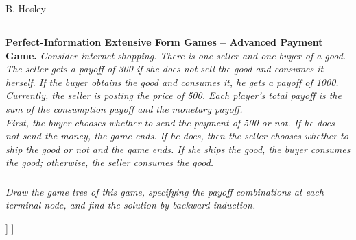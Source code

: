 \documentclass[12pt]{amsart}
\begin{document}
\raggedbottom

\hspace{\fill} {\large B. Hosley}
\bigskip



\subsection{}
\textbf{Perfect-Information Extensive Form Games – Advanced Payment Game.}\textit{ Consider
	internet shopping. There is one seller and one buyer of a good. The seller gets a payoff of
	300 if she does not sell the good and consumes it herself. If the buyer obtains the good and
	consumes it, he gets a payoff of 1000. Currently, the seller is posting the price of 500. Each
	player’s total payoff is the sum of the consumption payoff and the monetary payoff.} \\

\textit{First, the buyer chooses whether to send the payment of 500 or not. If he does not send
	the money, the game ends. If he does, then the seller chooses whether to ship the good or
	not and the game ends. If she ships the good, the buyer consumes the good; otherwise, the
	seller consumes the good.}

\subsubsection{}
\textit{Draw the game tree of this game, specifying the payoff combinations at each terminal
	node, and find the solution by backward induction.} \\
	
	\begin{center}
		\begin{forest}
			[\textcolor{white}{1}, circle, fill=ForestGreen, draw, font={\bfseries\large}
				[{(500,300)}, edge label={node[midway,left,font=\scriptsize]{Do Not Send Money}} ]
				[\textcolor{white}{2}, edge label={node[midway,right,font=\scriptsize]{Send Money}}, 
				circle, draw, fill=Maroon, font={\bfseries\large} 
					[{(0,800)}, edge label={node[midway,left,font=\scriptsize]{Do Not Ship Good}} ]
					[{(1000,500)}, edge label={node[midway,right,font=\scriptsize]{Ship Good}} ]
				]
			]
		\end{forest}
	\end{center}
	
\end{document}
